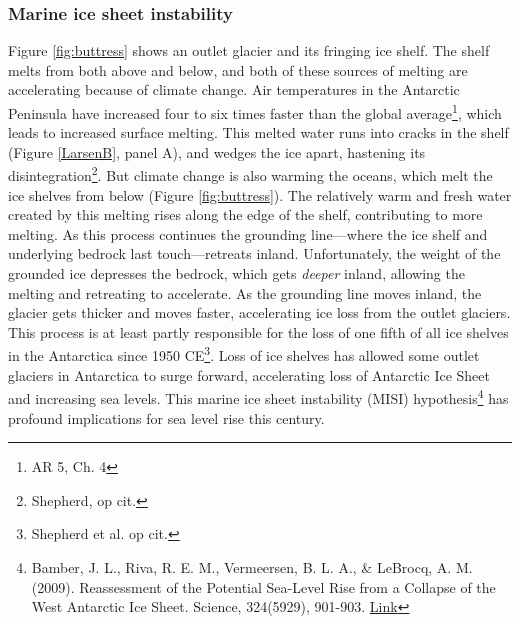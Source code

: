 \subsubsection{Marine ice sheet instability} Figure \ref{fig:buttress} shows an outlet glacier and its fringing ice shelf. The shelf melts from both above and below, and both of these sources of melting are accelerating because of climate change. Air temperatures in the Antarctic Peninsula have increased four to six times faster than the global average\footnote{AR 5, Ch. 4}, which leads to increased surface melting. This melted water runs into cracks in the shelf (Figure \ref{LarsenB}, panel A), and wedges the ice apart, hastening its disintegration\footnote{Shepherd, op cit.}. But climate change is also warming the oceans, which melt the ice shelves from below (Figure \ref{fig:buttress}). The relatively warm and fresh water created by this melting rises along the edge of the shelf, contributing to more melting. As this process continues the grounding line---where the ice shelf and underlying bedrock last touch---retreats inland. Unfortunately, the weight of the grounded ice depresses the bedrock, which gets \emph{deeper} inland, allowing the melting and retreating to accelerate. As the grounding line moves inland, the glacier gets thicker and moves faster, accelerating ice loss from the outlet glaciers. This process is at least partly responsible for the loss of one fifth of all ice shelves in the Antarctica since 1950 CE\footnote{Shepherd et al. op cit.}. Loss of ice shelves has allowed some outlet glaciers in Antarctica to surge forward, accelerating loss of Antarctic Ice Sheet and increasing sea levels. This marine ice sheet instability (MISI) hypothesis\footnote{Bamber, J. L., Riva, R. E. M., Vermeersen, B. L. A., \& LeBrocq, A. M. (2009). Reassessment of the Potential Sea-Level Rise from a Collapse of the West Antarctic Ice Sheet. Science, 324(5929), 901-903. \href{https://doi.org/10.1126/science.1169335}{Link}} has profound implications for sea level rise this century.\\

